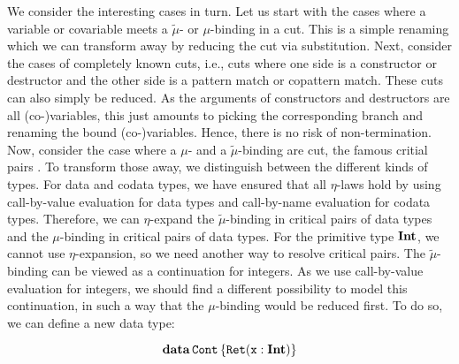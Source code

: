 We consider the interesting cases in turn.
Let us start with the cases where a variable or covariable meets a $\tilde\mu$- or $\mu$-binding in a cut.
This is a simple renaming which we can transform away by reducing the cut via substitution.
Next, consider the cases of completely known cuts, i.e., cuts where one side is a constructor or destructor and the other side is a pattern match or copattern match.
These cuts can also simply be reduced.
As the arguments of constructors and destructors are all (co-)variables, this just amounts to picking the corresponding branch and renaming the bound (co-)variables.
Hence, there is no risk of non-termination.
Now, consider the case where a $\mu$- and a $\tilde\mu$-binding are cut, the famous critial pairs \cite{Curien2000duality}.
To transform those away, we distinguish between the different kinds of types.
For data and codata types, we have ensured that all $\eta$-laws hold by using call-by-value evaluation for data types and call-by-name evaluation for codata types.
Therefore, we can $\eta$-expand the $\tilde\mu$-binding in critical pairs of data types and the $\mu$-binding in critical pairs of data types.
For the primitive type $\mathbf{Int}$, we cannot use $\eta$-expansion, so we need another way to resolve critical pairs.
The $\tilde\mu$-binding can be viewed as a continuation for integers.
As we use call-by-value evaluation for integers, we should find a different possibility to model this continuation, in such a way that the $\mu$-binding would be reduced first.
To do so, we can define a new data type:

\[
  \mathbf{data}\, \mathtt{Cont}\, \{ \mathtt{Ret(x : \mathbf{Int})} \}
\]

